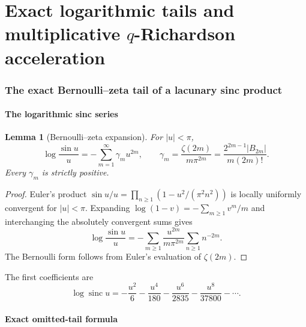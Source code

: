 \documentclass[11pt]{article}
\newtheorem{lemma}[theorem]{Lemma}
\theoremstyle{definition}
\theoremstyle{remark}
\newcommand{\sinc}{\operatorname{sinc}}
\begin{document}
\part{Exact logarithmic tails and multiplicative \texorpdfstring{$q$}{q}-Richardson acceleration}

\section{The exact Bernoulli--zeta tail of a lacunary sinc product}
\label{sec:tail}

\subsection{The logarithmic sinc series}

\begin{lemma}[Bernoulli--zeta expansion]
\label{lem:logsinc}
For $|u|<\pi$,
\begin{equation}
\log\frac{\sin u}{u}
=-\sum_{m=1}^{\infty}\gamma_m u^{2m},
\qquad
\gamma_m=\frac{\zeta(2m)}{m\pi^{2m}}
=\frac{2^{2m-1}|B_{2m}|}{m(2m)!}.
\label{eq:logsinc}
\end{equation}
Every $\gamma_m$ is strictly positive.
\end{lemma}

\begin{proof}
Euler's product
\(
\sin u/u=\prod_{n\ge1}(1-u^2/(\pi^2n^2))
\)
is locally uniformly convergent for $|u|<\pi$. Expanding $\log(1-v)=-\sum_{m\ge1}v^m/m$ and interchanging the absolutely convergent sums gives
\[
\log\frac{\sin u}{u}
=-\sum_{m\ge1}\frac{u^{2m}}{m\pi^{2m}}
\sum_{n\ge1}n^{-2m}.
\]
The Bernoulli form follows from Euler's evaluation of $\zeta(2m)$.
\end{proof}

The first coefficients are
\begin{equation}
\log\sinc u=-\frac{u^2}{6}-\frac{u^4}{180}
-\frac{u^6}{2835}-\frac{u^8}{37800}-\cdots.
\label{eq:logsinc-first}
\end{equation}

\subsection{Exact omitted-tail formula}
\end{document}
